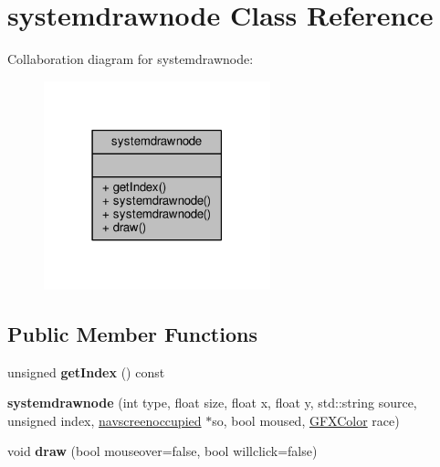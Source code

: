 \hypertarget{classsystemdrawnode}{}\section{systemdrawnode Class Reference}
\label{classsystemdrawnode}


Collaboration diagram for systemdrawnode\+:
\nopagebreak
\begin{figure}[H]
\begin{center}
\leavevmode
\includegraphics[width=186pt]{db/d49/classsystemdrawnode__coll__graph}
\end{center}
\end{figure}
\subsection*{Public Member Functions}
\begin{DoxyCompactItemize}
\item 
unsigned {\bfseries get\+Index} () const \hypertarget{classsystemdrawnode_a902101f921a400335c51706a600ea62f}{}\label{classsystemdrawnode_a902101f921a400335c51706a600ea62f}

\item 
{\bfseries systemdrawnode} (int type, float size, float x, float y, std\+::string source, unsigned index, \hyperlink{classnavscreenoccupied}{navscreenoccupied} $\ast$so, bool moused, \hyperlink{structGFXColor}{G\+F\+X\+Color} race)\hypertarget{classsystemdrawnode_aaa891dd4d5ad617d44b2e0db86ed4f16}{}\label{classsystemdrawnode_aaa891dd4d5ad617d44b2e0db86ed4f16}

\item 
void {\bfseries draw} (bool mouseover=false, bool willclick=false)\hypertarget{classsystemdrawnode_a2612f61402df6da8258622da21cbb0d4}{}\label{classsystemdrawnode_a2612f61402df6da8258622da21cbb0d4}

\end{DoxyCompactItemize}
